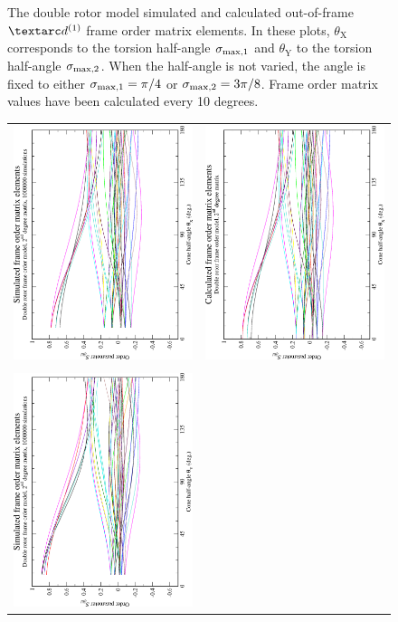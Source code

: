 \begin{figure}
\begin{tabular}{@{}cc@{}}
  \end{tabular}
  \caption[Double rotor simulated and calculated out-of-frame $\FOone$ elements.]{
    The double rotor model simulated and calculated out-of-frame $\FOone$ frame order matrix elements.
    In these plots, $\theta_\textrm{X}$ corresponds to the torsion half-angle $\sigma_{\textrm{max,1}}$ and $\theta_\textrm{Y}$ to the torsion half-angle $\sigma_{\textrm{max,2}}$.
    When the half-angle is not varied, the angle is fixed to either $\sigma_{\textrm{max,1}} = \pi/4$ or $\sigma_{\textrm{max,2}} = 3\pi/8$.
    Frame order matrix values have been calculated every 10 degrees.
  }
  \label{fig: simulated and calculated out-of-frame 1st degree double rotor frame order}
\end{figure}

\begin{figure}
\centering
  \begin{tabular}{@{}cc@{}}
    \includegraphics[width=.35\textwidth,angle=270]{images/frame_order_matrix/Sijkl_double_rotor_out_of_frame_theta_x_ens1000000.eps} &
    \includegraphics[width=.35\textwidth,angle=270]{images/frame_order_matrix/Sijkl_double_rotor_out_of_frame_theta_x_calc.eps} \\
    \\[-5pt]
    \includegraphics[width=.35\textwidth,angle=270]{images/frame_order_matrix/Sijkl_double_rotor_out_of_frame_theta_y_ens1000000.eps} &

\end{tabular}
\end{figure}
